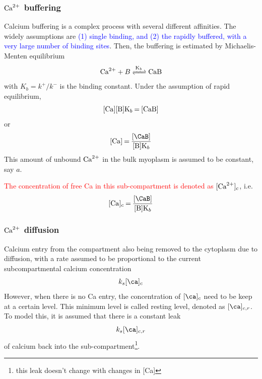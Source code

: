 \subsubsection{${\text{Ca}^{2+}}$ buffering}
\label{sec:buffering}


Calcium buffering is a complex process with several different
affinities. The widely assumptions are
\textcolor{blue}{(1) single binding, and (2) the rapidly buffered,
  with a very large number of binding sites}.
Then, the buffering is estimated by Michaelis-Menten equilibrium
\begin{equation}
  \label{eq:719}
  \Ca + B \ce{<=>[K_b]} \ce{CaB}
\end{equation}
with $K_b=k^+/k^-$ is the binding constant. Under the assumption of
rapid equilibrium,
\begin{equation}
  \label{eq:1044}
  \ce{[Ca][B]K_b = [CaB]}
\end{equation}
or
\begin{equation}
  \label{eq:1045}
  \ce{[Ca] = \frac{[\CaB]}{[B]K_b}}
\end{equation}
This amount of unbound ${\text{Ca}^{2+}}$ in the bulk myoplasm is assumed to be constant, say
$a$.

\textcolor{red}{The concentration of free Ca in this sub-compartment
  is denoted as} $[{\text{Ca}^{2+}}]_c$, i.e.
\begin{equation}
  \label{eq:1251}
  \ce{[Ca]_c = \frac{[\CaB]}{[B]K_b}}
\end{equation}

\subsubsection{${\text{Ca}^{2+}}$ diffusion}
\label{sec:diffusion}


Calcium entry from the compartment also being removed to the cytoplasm
due to diffusion, with a rate assumed to be proportional to the
current subcompartmental calcium concentration
\begin{equation}
  \label{eq:625}
  k_s[\ca]_c
\end{equation}
However, when there is no Ca entry, the concentration of $[\ca]_c$
need to be keep at a certain level. This minimum level is called
resting level, denoted as $[\ca]_{c,r}$. To model this, it is assumed
that there is a constant leak
\begin{equation}
  \label{eq:626}
  k_s[\ca]_{c,r}
\end{equation}
of calcium back into the
sub-compartment\footnote{ this leak doesn't change with changes in
  [Ca]}.

